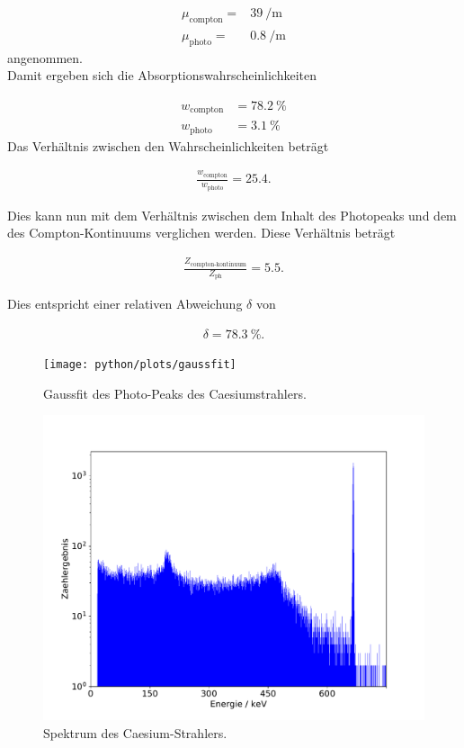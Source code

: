 \begin{align*}
  \mu_\text{compton} = &\SI{39}{\per\meter}\\
  \mu_\text{photo} = &\SI{0.8}{\per\meter}
\end{align*}
angenommen. \\
Damit ergeben sich die Absorptionswahrscheinlichkeiten

\begin{align*}
  w_\text{compton} &= \SI{78.2}{\percent}\\
  w_\text{photo} &= \SI{3.1}{\percent}
\end{align*}
Das Verhältnis zwischen den Wahrscheinlichkeiten beträgt

\begin{align*}
    \frac{w_\text{compton}}{w_\text{photo}} = 25.4 .
\end{align*}

Dies kann nun mit dem Verhältnis zwischen dem Inhalt des Photopeaks und dem des Compton-Kontinuums verglichen werden.
Diese Verhältnis beträgt

\begin{align*}
  \frac{Z_\text{compton-kontinuum}}{Z_\text{ph}} = 5.5 .
\end{align*}

Dies entspricht einer relativen Abweichung $\delta$ von

\begin{align*}
  \delta = \SI{78.3}{\percent} .
\end{align*}

\begin{figure}
  \centering
  \texttt{[image: python/plots/gaussfit]}
  \caption{Gaussfit des Photo-Peaks des Caesiumstrahlers.}
  \label{fig:gfit2}
\end{figure}

\begin{figure}
  \centering
  \includegraphics[width=\textwidth]{python/plots/spec2.pdf}
  \caption{Spektrum des Caesium-Strahlers.}
  \label{fig:spectrum_caesium}
\end{figure}

